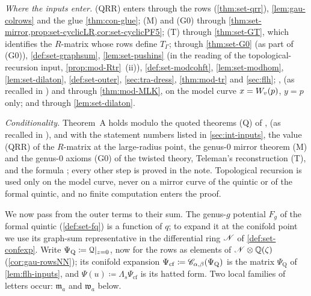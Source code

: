 \emph{Where the inputs enter.} (QRR) enters through the rows (\cref{thm:set-qrr}), \cref{lem:gau-colrows} and the glue \cref{thm:con-glue}; (M) and (G0) through \cref{thm:set-mirror,prop:set-cyclicLR,cor:set-cyclicPF5}; (T) through \cref{thm:set-GT}, which identifies the $R$-matrix whose rows define $T_\Gamma$; \cite{PPZ15} through \cref{thm:set-G0} (as part of (G0)), \cref{def:set-graphsum}, \cref{lem:set-pushins} (in the reading of the topological-recursion input, \cref{prop:mod-Rtr}~(ii)), \cref{def:set-modcohft}, \cref{lem:set-modhom}, \cref{lem:set-dilaton}, \cref{def:set-outer}, \cref{sec:tra-dress}, \cref{thm:mod-tr} and \cref{sec:flh}; \cite{Eynard:2007kz}, \cite{DuninBarkowski:2012bw} (as recalled in \cite{Dunin-Barkowski:2015caa}) and \cite{ABDKS25} through \cref{thm:mod-MLK}, on the model curve $x=W_{v}(p)$, $y=p$ only; and \cite[(1.7)]{AC96} through \cref{lem:set-dilaton}.

\emph{Conditionality.} Theorem~A holds modulo the quoted theorems (Q) of \cite{Eynard:2007kz}, \cite{DuninBarkowski:2012bw} (as recalled in \cite{Dunin-Barkowski:2015caa}), \cite{ABDKS25} and \cite{PPZ15} with the statement numbers listed in \cref{sec:int-inputs}, the value (QRR) of the $R$-matrix at the large-radius point, the genus-$0$ mirror theorem (M) and the genus-$0$ axioms (G0) of the twisted theory, Teleman's reconstruction (T), and the formula \cite[(1.7)]{AC96}; every other step is proved in the note. Topological recursion is used only on the model curve, never on a mirror curve of the quintic or of the formal quintic, and no finite computation enters the proof.

We now pass from the outer terms to their sum. The genus-$g$ potential $F_g$ of the formal quintic (\cref{def:set-fq}) is a function of $q$; to expand it at the conifold point we use its graph-sum representative in the differential ring $\mathscr{N}$ of \cref{def:set-confexp}. Write $\Psi_{\mathrm Q}\coloneqq\mathcal{Q}|_{z=0}$, now for the rows as elements of $\mathscr{N}\otimes\mathbb{Q}(\zeta)$ (\cref{cor:gau-rowsNN}); its conifold expansion $\Psi_{\mathrm{cf}}\coloneqq\mathscr{C}_{\alpha,\beta}(\Psi_{\mathrm Q})$ is the matrix $\Psi_{\mathrm Q}$ of \cref{lem:flh-inputs}, and $\Psi(u)\coloneqq\Lambda_s\Psi_{\mathrm{cf}}$ is its hatted form. Two local families of letters occur: $\mathfrak m_a$ and $\mathfrak w_a$ below.

